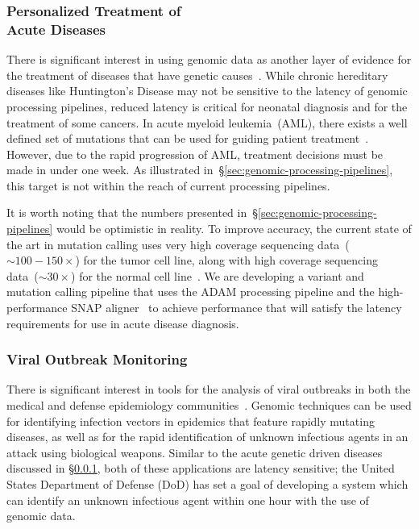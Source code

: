 \documentclass[10pt,twocolumn]{article}
\theoremstyle{plain}
\begin{document}
\subsubsection{Personalized Treatment of\\Acute Diseases}
\label{sec:personalized-acute-diseases}

There is significant interest in using genomic data as another layer of evidence for the treatment of diseases that have genetic
causes~\cite{ghosh09, van13}. While chronic hereditary diseases like Huntington's Disease may not be sensitive to the latency of genomic
processing pipelines, reduced latency is critical for neonatal diagnosis and for the treatment of some cancers. In acute myeloid
leukemia~(AML), there exists a well defined set of mutations that can be used for guiding patient treatment~\cite{smith12}. However,
due to the rapid progression of AML, treatment decisions must be made in under one week. As illustrated
in~\S\ref{sec:genomic-processing-pipelines}, this target is not within the reach of current processing pipelines.

It is worth noting that the numbers presented in~\S\ref{sec:genomic-processing-pipelines} would be optimistic in reality. To improve
accuracy, the current state of the art in mutation calling uses very high coverage sequencing data~($\sim100-150\times$) for the
tumor cell line, along with high coverage sequencing data~($\sim30\times$) for the normal cell line~\cite{cibulskis13}. We are
developing a variant and mutation calling pipeline that uses the ADAM processing pipeline and the high-performance SNAP
aligner~\cite{zaharia11} to achieve performance that will satisfy the latency requirements for use in acute disease diagnosis.

\subsubsection{Viral Outbreak Monitoring}
\label{sec:viral-outbreak-monitoring}

There is significant interest in tools for the analysis of viral outbreaks in both the medical and defense epidemiology
communities~\cite{snitkin12,beard08}. Genomic techniques can be used for identifying infection vectors in epidemics that
feature rapidly mutating diseases, as well as for the rapid identification of unknown infectious agents in an attack using
biological weapons. Similar to the acute genetic driven diseases discussed in \S\ref{sec:personalized-acute-diseases}, both
of these applications are latency sensitive; the United States Department of Defense (DoD) has set a goal of developing a
system which can identify an unknown infectious agent within one hour with the use of genomic data.
\end{document}
